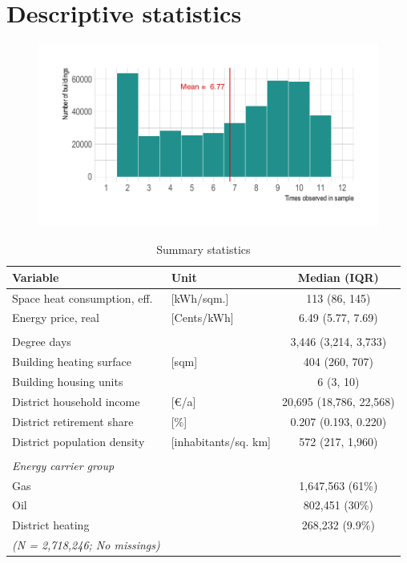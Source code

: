 \documentclass[12pt,twoside]{reedthesis}
\begin{document}
\hypertarget{descriptives}{%
\section{Descriptive statistics}\label{descriptives}}
\begin{figure}

{\centering \includegraphics[width=0.65\linewidth]{figure/occurance_buildings} 

}

\end{figure}
\begin{table}[]
\centering
\caption{Summary statistics}
\label{tab:summarytable}
\begin{tabular}{@{}llc@{}}
\toprule
\textbf{Variable}             & \textbf{Unit}            & \textbf{Median (IQR)}   \\ \midrule
Space heat consumption, eff.  & {[}kWh/sqm.{]}           & 113 (86, 145)           \\
Energy price, real            & {[}Cents/kWh{]}          & 6.49 (5.77, 7.69)       \\
                              &                          &                         \\
Degree days                   &                          & 3,446 (3,214, 3,733)    \\
Building heating surface      & {[}sqm{]}                & 404 (260, 707)          \\
Building housing units        &                          & 6 (3, 10)               \\
District household income     & {[}€/a{]}                & 20,695 (18,786, 22,568) \\
District retirement share     & {[}\%{]}                 & 0.207 (0.193, 0.220)    \\
District population density   & {[}inhabitants/sq. km{]} & 572 (217, 1,960)        \\
                              &                          &                         \\
\textit{Energy carrier group} & {\ul \textit{}}          &                         \\
Gas                           &                          & 1,647,563 (61\%)        \\
Oil                           &                          & 802,451 (30\%)          \\
District heating              &                          & 268,232 (9.9\%)         \\ \midrule
\textit{(N = 2,718,246; No missings)}  &                          & \multicolumn{1}{l}{}   
\end{tabular}
\end{table}
\end{document}
